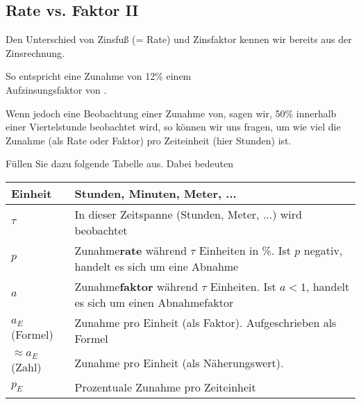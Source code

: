 \subsection{Rate vs. Faktor II}

Den Unterschied von Zinsfuß (= Rate) und Zinsfaktor kennen wir bereits aus der Zinsrechnung.

So entspricht eine Zunahme von 12\% einem\\
Aufzinsungsfaktor von .

Wenn jedoch eine Beobachtung einer Zunahme von, sagen wir, 50\% innerhalb einer Viertelstunde beobachtet wird, so können wir uns fragen, um wie viel die Zunahme (als Rate oder Faktor) pro Zeiteinheit (hier Stunden) ist.


Füllen Sie dazu folgende Tabelle aus. Dabei bedeuten

\begin{tabular}{lp{14cm}}\hline
  Einheit & Stunden, Minuten, Meter, ... \\\hline
  $\tau$  & In dieser Zeitspanne (Stunden, Meter, ...) wird beobachtet \\\hline
  $p$     & Zunahme\textbf{rate}\index{Zunahmerate}\index{Rate} während $\tau$ Einheiten in \%. Ist $p$ negativ, handelt es sich um eine Abnahme\\\hline
  $a$     & Zunahme\textbf{faktor}\index{Zunahmefaktor} während $\tau$ Einheiten. Ist $a<1$, handelt es sich um einen Abnahmefaktor\\\hline
  $a_E$ (Formel)   & Zunahme pro Einheit (als Faktor). Aufgeschrieben als Formel\\\hline
  $\approx a_E$ (Zahl)  & Zunahme pro Einheit (als Näherungswert).\\\hline
  $p_E$   & Prozentuale Zunahme pro Zeiteinheit\\\hline
  \end{tabular} 

\leserluft{}
\leserluft{}
\newcommand{\ph}[1]{\noTRAINER{...........}\TRAINER{#1}}

\renewcommand{\arraystretch}{1.7}

